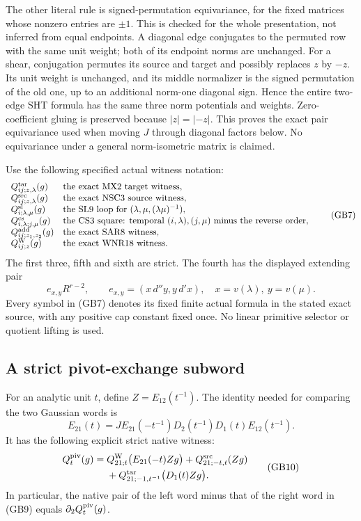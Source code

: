 The other literal rule is signed-permutation equivariance, for
the fixed matrices whose nonzero entries are $\pm1$.  This is
checked for the whole presentation, not inferred from equal
endpoints.  A diagonal edge conjugates to the permuted row with
the same unit weight; both of its endpoint norms are unchanged.
For a shear, conjugation permutes its source and target and
possibly replaces $z$ by $-z$.  Its unit weight is unchanged,
and its middle normalizer is the signed permutation of the old
one, up to an additional norm-one diagonal sign.  Hence the
entire two-edge SHT formula has the same three norm potentials
and weights.  Zero-coefficient gluing is preserved because
$|z|=|-z|$.  This proves the exact pair equivariance used when
moving $J$ through diagonal factors below.  No equivariance under
a general norm-isometric matrix is claimed.

Use the following specified actual witness notation:
\[
 \begin{array}{ll}
 Q^{\rm tar}_{ij;z,\lambda}(g)&\text{the exact MX2 target witness},\\
 Q^{\rm src}_{ij;z,\lambda}(g)&\text{the exact NSC3 source witness},\\
 Q^{\rm sl}_{i;\lambda,\mu}(g)&\text{the SL9 loop for }
       (\lambda,\mu,(\lambda\mu)^{-1}),\\
 Q^{\rm cs}_{i,\lambda;j,\mu}(g)&\text{the CS3 square: temporal }
           (i,\lambda),(j,\mu)\text{ minus the reverse order},\\
 Q^{\rm add}_{ij;z_1,z_2}(g)&\text{the exact SAR8 witness},\\
 Q^{\rm W}_{ij;z}(g)&\text{the exact WNR18 witness}.
 \end{array}
 \tag{GB7}
\]
The first three, fifth and sixth are strict.  The fourth has the
displayed extending pair
\[
 e_{x,y}R^{r-2},\qquad
 e_{x,y}=(x\,d''y,y\,d'x),\quad x=v(\lambda),\ y=v(\mu).
 \tag{GB8}
\]
Every symbol in (GB7) denotes its fixed finite actual formula in
the stated exact source, with any positive cap constant fixed
once.  No linear primitive selector or quotient lifting is used.

\subsection{A strict pivot-exchange subword}

For an analytic unit $t$, define $Z=E_{12}(t^{-1})$.  The identity
needed for comparing the two Gaussian words is
\[
 E_{21}(t)=J E_{21}(-t^{-1})D_2(t^{-1})D_1(t)E_{12}(t^{-1}).
 \tag{GB9}
\]
It has the following explicit strict native witness:
\[
 \begin{split}
 Q^{\rm piv}_t(g)={}&
 Q^{\rm W}_{21;t}\bigl(E_{21}(-t)Zg\bigr)
 +Q^{\rm src}_{21;-t,t}(Zg)\\
 &+Q^{\rm tar}_{21;-1,t^{-1}}\bigl(D_1(t)Zg\bigr).
 \end{split}
 \tag{GB10}
\]
In particular, the native pair of the left word minus that of
the right word in (GB9) equals $\partial_2Q^{\rm piv}_t(g)$.


